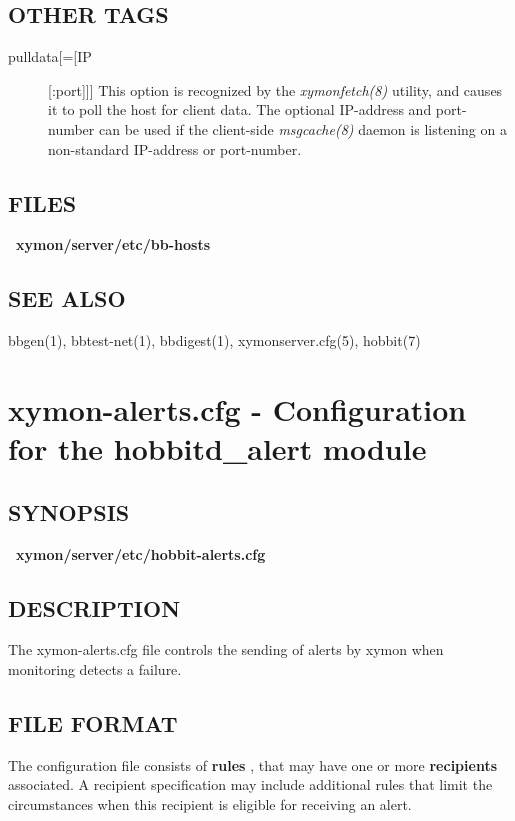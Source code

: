 \subsection{OTHER TAGS}
\begin{description}
\item[pulldata[=[IP][:port]]] This option is recognized by the
  \emph{xymonfetch(8)} utility, and causes it to poll the host for
  client data. The optional IP-address and port-number can be used if
  the client-side \emph{msgcache(8)} daemon is listening on a
  non-standard IP-address or port-number. 


 

\end{description}
\subsection{FILES}
\textbf{~xymon/server/etc/bb-hosts}


 
\subsection{SEE ALSO}
bbgen(1), bbtest-net(1), bbdigest(1), xymonserver.cfg(5), hobbit(7) 

 

%
\newpage
\section{xymon-alerts.cfg - Configuration for the hobbitd\_alert module}
 
\subsection{SYNOPSIS}
\textbf{~xymon/server/etc/hobbit-alerts.cfg}


 
\subsection{DESCRIPTION}
 The xymon-alerts.cfg file controls the sending of alerts by xymon when monitoring detects a failure. 

 
\subsection{FILE FORMAT}
 The configuration file consists of \textbf{rules}
, that may have one or more \textbf{recipients}
 associated. A recipient specification may include additional rules that limit the circumstances when this recipient is eligible for receiving an alert. 

